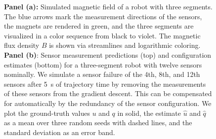 \begin{figure}[hbt]
\centering
\caption{\textbf{Panel (a):} Simulated magnetic field of a robot with three segments. The blue arrows mark the measurement directions of the sensors, the magnets are rendered in green, and the three segments are visualized in a color sequence from black to violet. The magnetic flux density $B$ is shown via streamlines and logarithmic coloring. \textbf{Panel (b)}: Sensor measurement predictions (top) and configuration estimates (bottom) for a three-segment robot with twelve sensors nominally. We simulate a sensor failure of the 4th, 8th, and 12th sensors after \SI{5}{s} of trajectory time by removing the measurements of these sensors from the gradient descent. This can be compensated for automatically by the redundancy of the sensor configuration. We plot the ground-truth values $u$ and $q$ in solid, the estimate $\hat{u}$ and $\hat{q}$ as a mean over three random seeds with dashed lines, and the standard deviation as an error band.}
\end{figure}

